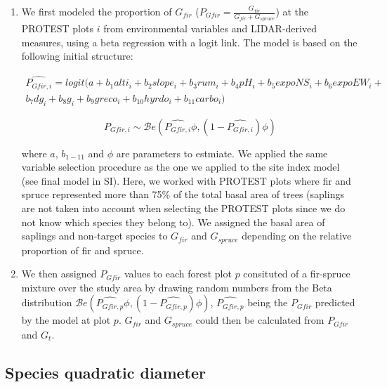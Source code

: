\documentclass[a4paper]{article}
\begin{document}
\begin{enumerate}

  \item We first modeled the proportion of $G_{fir}$ ($P_{Gfir} = \frac{G_{fir}}{G_{fir} + G_{spruce}}$) at the PROTEST plots $i$ from environmental variables and LIDAR-derived measures, using a beta regression with a logit link. The model is based on the following initial structure:

  \begin{multline}\label{gfir-spruce}
    \widehat{P_{Gfir,i}} = logit(a + b_1 alti_i + b_2 slope_i + b_3 rum_i + b_4 pH_i + b_5 expoNS_i + b_6 expoEW_i + \\ b_7 dg_i + b_8 g_i + b_9 greco_i + b_{10} hyrdo_i + b_{11} carbo_i)
  \end{multline}

  \begin{equation}\label{}
    P_{Gfir,i} \sim \mathcal{B}e (\widehat{P_{Gfir,i}}\phi, (1-\widehat{P_{Gfir,i}})\phi)
  \end{equation}

  \noindent where $a$, $b_{1-11}$ and $\phi$ are parameters to estmiate. We applied the same variable selection procedure as the one we applied to the site index model (see final model in SI). Here, we worked with PROTEST plots where fir and spruce represented more than 75\% of the total basal area of trees (saplings are not taken into account when selecting the PROTEST plots since we do not know which species they belong to). We assigned the basal area of saplings and non-target species to $G_{fir}$ and $G_{spruce}$ depending on the relative proportion of fir and spruce.

  \item We then assigned $P_{Gfir}$ values to each forest plot $p$ consituted of a fir-spruce mixture over the study area by drawing random numbers from the Beta distribution $\mathcal{B}e (\widehat{P_{Gfir,p}}\phi, (1-\widehat{P_{Gfir,p}})\phi)$, $\widehat{P_{Gfir,p}}$ being the $P_{Gfir}$ predicted by the model at plot $p$. $G_{fir}$ and $G_{spruce}$ could then be calculated from $P_{Gfir}$ and $G_t$.

\end{enumerate}


\subsection*{Species quadratic diameter}\label{Dg}
\end{document}
